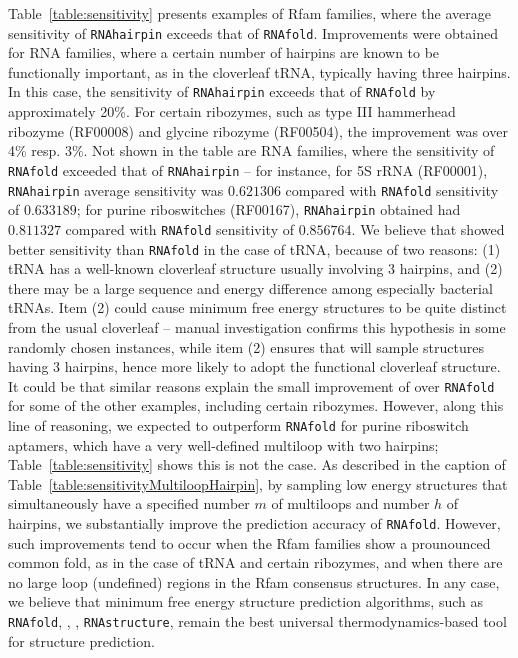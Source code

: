 Table~\ref{table:sensitivity} presents examples of Rfam families, where
the average sensitivity of {\tt RNAhairpin} exceeds that of {\tt RNAfold}.
Improvements were obtained for RNA families, where a certain number of
hairpins are known to be functionally important, as in the cloverleaf
tRNA, typically having three hairpins. In this case, the sensitivity of
{\tt RNAhairpin} exceeds that of {\tt RNAfold} by approximately 20\%.
For certain ribozymes, such as type III hammerhead ribozyme (RF00008)
and glycine ribozyme (RF00504), the improvement was over 4\% resp. 3\%.
Not shown in the table are RNA families, where the sensitivity of
{\tt RNAfold} exceeded that of {\tt RNAhairpin} -- for instance,
for 5S rRNA (RF00001), {\tt RNAhairpin} average sensitivity was
$0.621306$ compared with {\tt RNAfold} sensitivity of $0.633189$;
for purine riboswitches (RF00167), {\tt RNAhairpin} obtained had
$0.811327$ compared with {\tt RNAfold} sensitivity of  $0.856764$.
We believe that {\rnahairpin} showed better sensitivity than {\tt RNAfold}
in the case of tRNA, because of two reasons: (1) tRNA has a well-known
cloverleaf structure usually involving 3 hairpins, and (2) there may
be a large sequence and energy difference among especially bacterial
tRNAs. Item (2) could cause minimum free energy structures to be quite
distinct from the usual cloverleaf -- manual investigation
confirms this hypothesis in some randomly chosen instances, while item
(2) ensures that {\rnahairpin} will sample structures having 3 hairpins,
hence more likely to adopt the functional cloverleaf structure.
It could be that similar reasons explain the small improvement of
{\rnahairpin} over {\tt RNAfold} for some of the other examples, including
certain ribozymes. However, along this line of reasoning, we expected
{\rnahairpin} to outperform {\tt RNAfold} for purine riboswitch aptamers,
which have a very well-defined multiloop with two hairpins;
Table~\ref{table:sensitivity} shows this is not the case.
As described in the caption of
Table~\ref{table:sensitivityMultiloopHairpin}, by sampling low energy
structures that simultaneously have a specified number $m$ of multiloops and
number $h$ of hairpins, we substantially improve the prediction accuracy
of {\tt RNAfold}. However, such improvements tend to occur when the Rfam
families show a prounounced common fold, as in the case of tRNA and certain
ribozymes, and when there are no large loop (undefined) regions in the
Rfam consensus structures.  In any case, we believe that
minimum free energy structure prediction algorithms, such as
{\tt RNAfold}, {\unafold}, {\mfold}, {\tt RNAstructure}, remain
the best universal thermodynamics-based tool for structure prediction.


